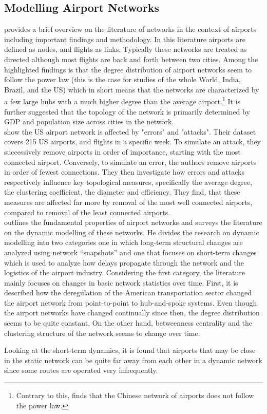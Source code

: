 \subsection{Modelling Airport Networks}
\citet[pp. 41-42]{costa2011analyzing} provides a brief overview on the literature of networks in the context of airports including important findings and methodology. In this literature airports are defined as nodes, and flights as links. Typically these networks are treated as directed although most flights are back and forth between two cities. Among the highlighted findings is that the degree distribution of airport networks seem to follow the power law (this is the case for studies of the whole World, India, Brazil, and the US) which in short means that the networks are characterized by a few large hubs with a much higher degree than the average airport.\footnote{Contrary to this, \citet{he2004statistics} finds that the Chinese network of airports does not follow the power law.} It is further suggested that the topology of the network is primarily determined by GDP and population size across cities in the network.
\medskip\\
\citet{chi2004structural} show the US airport network is affected by "errors" and "attacks". Their dataset covers 215 US airports, and flights in a specific week. To simulate an attack, they successively remove airports in order of importance, starting with the most connected airport. Conversely, to simulate an error, the authors remove airports in order of fewest connections. They then investigate how errors and attacks respectively influence key topological measures, specifically the average degree, the clustering coefficient, the diameter and efficiency. They find, that these measures are affected far more by removal of the most well connected airports, compared to removal of the least connected airports.
\medskip\\
\citet{rocha2017dynamics} outlines the fundamental properties of airport networks and surveys the literature on the dynamic modelling of these networks. He divides the research on dynamic modelling into two categories one in which long-term structural changes are analyzed using network ``snapshots'' and one that focuses on short-term changes which is used to analyze how delays propagate through the network and the logistics of the airport industry. Considering the first category, the literature mainly focuses on changes in basic network statistics over time. First, it is described how the deregulation of the American transportation sector changed the airport network from point-to-point to hub-and-spoke systems. Even though the airport networks have changed continually since then, the degree distribution seems to be quite constant. On the other hand, betweenness centrality and the clustering structure of the network seems to change over time.
\par
Looking at the short-term dynamics, it is found that airports that may be close in the static network can be quite far away from each other in a dynamic network since some routes are operated very infrequently.  


